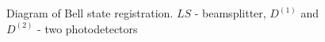 \begin{figure}
\centering


\caption{Diagram of Bell state registration. $LS$ - beamsplitter,
  $D^{(1)}$ and $D^{(2)}$ - two photodetectors}
\label{figBellReg}
\end{figure}